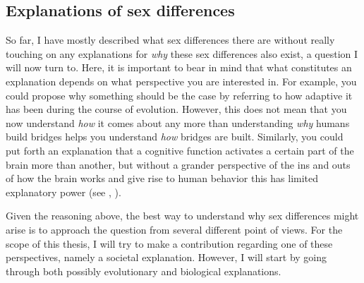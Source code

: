 \subsection{Explanations of sex differences}

So far, I have mostly described what sex differences there are without really touching on any explanations for \emph{why} these sex differences also exist, a question I will now turn to. Here, it is important to bear in mind that what constitutes an explanation depends on what perspective you are interested in. For example, you could propose why something should be the case by referring to how adaptive it has been during the course of evolution. However, this does not mean that you now understand \emph{how} it comes about any more than understanding \emph{why} humans build bridges helps you understand \emph{how} bridges are built. Similarly, you could put forth an explanation that a cognitive function activates a certain part of the brain more than another, but without a grander perspective of the ins and outs of how the brain works and give rise to human behavior this has limited explanatory power (see \citeauthor{Eric2017}, \citeyear{Eric2017}).

Given the reasoning above, the best way to understand why sex differences might arise is to approach the question from several different point of views. For the scope of this thesis, I will try to make a contribution regarding one of these perspectives, namely a societal explanation. However, I will start by going through both possibly evolutionary and biological explanations.


